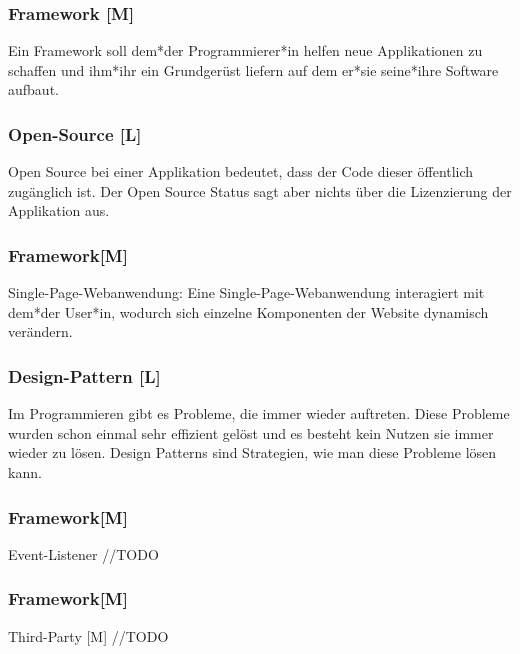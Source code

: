 \subsubsection{Framework [M]}

Ein Framework soll dem*der Programmierer*in helfen neue Applikationen zu schaffen und ihm*ihr ein Grundgerüst liefern auf dem er*sie seine*ihre Software aufbaut.  

\subsubsection{Open-Source [L]}
Open Source bei einer Applikation bedeutet, dass der Code dieser öffentlich zugänglich ist. Der Open Source Status sagt aber nichts über die Lizenzierung der Applikation aus. 

\subsubsection{Framework[M]}
Single-Page-Webanwendung: 
Eine Single-Page-Webanwendung interagiert mit dem*der User*in, wodurch sich einzelne Komponenten der Website dynamisch verändern.

\subsubsection{Design-Pattern [L]}
Im Programmieren gibt es Probleme, die immer wieder auftreten. Diese Probleme wurden schon einmal sehr effizient gelöst und es besteht kein Nutzen sie immer wieder zu lösen. Design Patterns sind Strategien, wie man diese Probleme lösen kann. 

\subsubsection{Framework[M]}
Event-Listener
//TODO

\subsubsection{Framework[M]}
Third-Party [M]
//TODO
